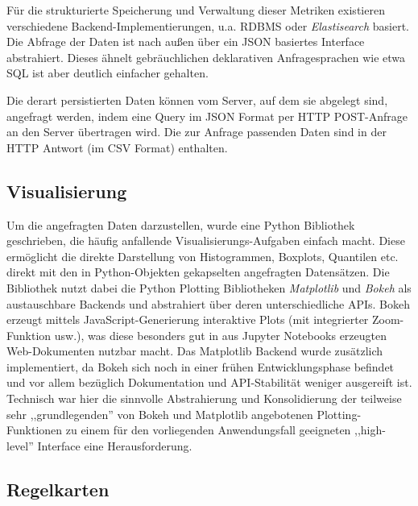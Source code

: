 Für die strukturierte Speicherung und Verwaltung dieser Metriken existieren
verschiedene Backend-Implementierungen, u.a. RDBMS oder \textit{Elastisearch}
basiert.  Die Abfrage der Daten ist nach außen über ein JSON basiertes
Interface abstrahiert. Dieses ähnelt gebräuchlichen deklarativen
Anfragesprachen wie etwa SQL ist aber deutlich einfacher gehalten.

Die derart persistierten Daten können vom Server, auf dem sie abgelegt sind,
angefragt werden, indem eine Query im JSON Format per HTTP POST-Anfrage an den
Server übertragen wird. Die zur Anfrage passenden Daten sind in der HTTP
Antwort (im CSV Format) enthalten.

\subsection{Visualisierung}

Um die angefragten Daten darzustellen, wurde eine Python Bibliothek geschrieben,
die häufig anfallende Visualisierungs-Aufgaben einfach macht.  Diese ermöglicht
die direkte Darstellung von Histogrammen, Boxplots, Quantilen etc. direkt mit
den in Python-Objekten gekapselten angefragten Datensätzen. Die Bibliothek
nutzt dabei die Python Plotting Bibliotheken \textit{Matplotlib} und
\textit{Bokeh} als austauschbare Backends und abstrahiert über deren
unterschiedliche APIs. Bokeh erzeugt mittels JavaScript-Generierung interaktive
Plots (mit integrierter Zoom-Funktion usw.), was diese besonders gut in aus
Jupyter Notebooks erzeugten Web-Dokumenten nutzbar macht. Das Matplotlib
Backend wurde zusätzlich implementiert, da Bokeh sich noch in einer frühen
Entwicklungsphase befindet und vor allem bezüglich Dokumentation und
API-Stabilität weniger ausgereift ist. Technisch war hier die sinnvolle
Abstrahierung und Konsolidierung der teilweise sehr ,,grundlegenden'' von Bokeh
und Matplotlib angebotenen Plotting-Funktionen zu einem für den vorliegenden
Anwendungsfall geeigneten ,,high-level'' Interface eine Herausforderung.

\subsection{Regelkarten}

